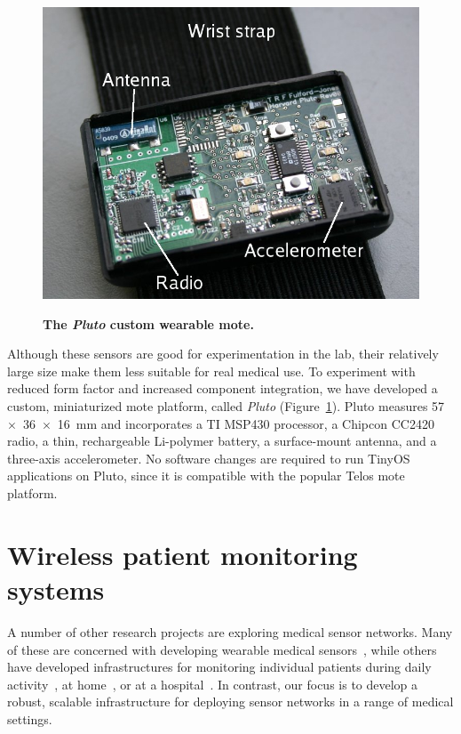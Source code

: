 \begin{figure}[t]
\begin{center}
\includegraphics[height=0.18\vsize]{./resources/codeblue-nsdi06/figures/pics/pluto5.jpg} \\
\end{center}
\caption{{\small {\bf The {\em Pluto} custom wearable mote.}}}
\label{fig-pluto}
\end{figure}
Although these sensors are good for experimentation in the lab, their
relatively large size make them less suitable for real medical use. 
To experiment with reduced form factor and increased component
integration, we have developed a custom, miniaturized mote platform,
called {\em Pluto} (Figure~\ref{fig-pluto}). Pluto measures 
57~$\times$~36~$\times$~16~mm and incorporates a 
TI MSP430 processor, a Chipcon CC2420 radio, a thin, rechargeable 
Li-polymer battery, a surface-mount antenna, and a three-axis 
accelerometer. No software changes are required to run TinyOS
applications on Pluto, since it is compatible with the popular Telos
mote platform. 


\section{Wireless patient monitoring systems}
A number of other research projects are exploring medical sensor 
networks. Many of these are concerned with developing
wearable medical sensors~\cite{bennylo-05,bsn-node,eugene-shih-demo}, 
while others have developed infrastructures for monitoring 
individual patients during daily activity~\cite{mobihealth-ist},
at home~\cite{proactive-health}, or at a hospital~\cite{ubimon}.
In contrast, our focus is to develop a robust, scalable infrastructure 
for deploying sensor networks in a range of medical settings.

